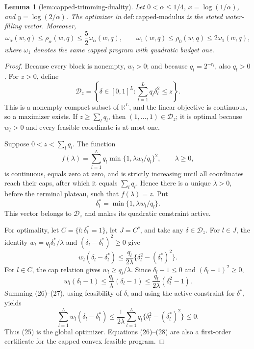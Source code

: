 \documentclass{article}
\newtheorem{lemma}{Lemma}
\begin{document}
\begin{lemma}[lem:capped-trimming-duality]\label{lem:capped-trimming-duality}
Let \(0<\alpha\le1/4\), \(x=\log(1/\alpha)\), and \(y=\log(2/\alpha)\). The optimizer in \(\mathrm{def{:}capped\text{-}modulus}\) is the stated water-filling vector. Moreover,
\[
 \omega_\alpha(w,q)\le\rho_\alpha(w,q)\le\frac52\omega_\alpha(w,q),
 \qquad
 \omega_1(w,q)\le\rho_0(w,q)\le2\omega_1(w,q),
\]
where \(\omega_1\) denotes the same capped program with quadratic budget one.
\end{lemma}
\begin{proof}
Because every block is nonempty, \(w_l>0\); and because \(q_l=2^{-r_l}\), also \(q_l>0\). For \(z>0\), define
\[
 \mathcal D_z=\left\{\delta\in[0,1]^L:
                 \sum_{l=1}^Lq_l\delta_l^2\le z\right\}.
\tag{23}
\]
This is a nonempty compact subset of \(\mathbb R^L\), and the linear objective is continuous, so a maximizer exists. If \(z\ge\sum_lq_l\), then \((1,\ldots,1)\in\mathcal D_z\); it is optimal because \(w_l>0\) and every feasible coordinate is at most one.

Suppose \(0<z<\sum_lq_l\). The function
\[
 f(\lambda)=\sum_{l=1}^Lq_l\min\{1,\lambda w_l/q_l\}^2,
 \qquad \lambda\ge0,
\tag{24}
\]
is continuous, equals zero at zero, and is strictly increasing until all coordinates reach their caps, after which it equals \(\sum_lq_l\). Hence there is a unique \(\lambda>0\), before the terminal plateau, such that \(f(\lambda)=z\). Put
\[
 \delta_l^*=\min\{1,\lambda w_l/q_l\}.
\tag{25}
\]
This vector belongs to \(\mathcal D_z\) and makes its quadratic constraint active.

For optimality, let \(C=\{l:\delta_l^*=1\}\), let \(J=C^c\), and take any \(\delta\in\mathcal D_z\). For \(l\in J\), the identity \(w_l=q_l\delta_l^*/\lambda\) and \((\delta_l-\delta_l^*)^2\ge0\) give
\[
 w_l(\delta_l-\delta_l^*)
 \le\frac{q_l}{2\lambda}\{\delta_l^2-(\delta_l^*)^2\}.
\tag{26}
\]
For \(l\in C\), the cap relation gives \(w_l\ge q_l/\lambda\). Since \(\delta_l-1\le0\) and \((\delta_l-1)^2\ge0\),
\[
 w_l(\delta_l-1)
 \le\frac{q_l}{\lambda}(\delta_l-1)
 \le\frac{q_l}{2\lambda}(\delta_l^2-1).
\tag{27}
\]
Summing (26)--(27), using feasibility of \(\delta\), and using the active constraint for \(\delta^*\), yields
\[
 \sum_{l=1}^Lw_l(\delta_l-\delta_l^*)
 \le\frac1{2\lambda}\sum_{l=1}^Lq_l\{\delta_l^2-(\delta_l^*)^2\}
 \le0.
\tag{28}
\]
Thus (25) is the global optimizer. Equations (26)--(28) are also a first-order certificate for the capped convex feasible program.


\end{proof}
\end{document}
